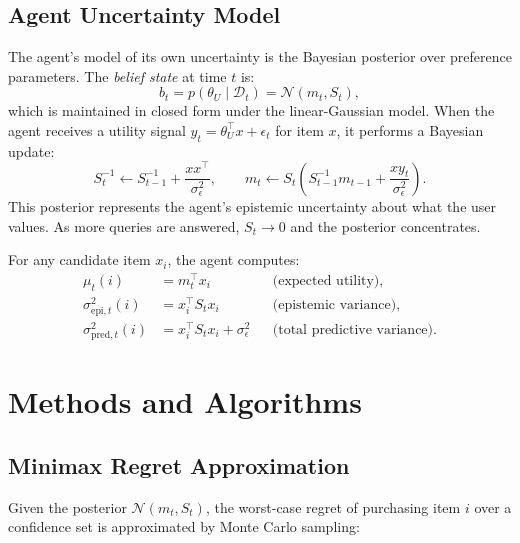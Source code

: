 \documentclass[11pt,letterpaper]{article}
\newcommand{\thetaU}{\theta_U}
\begin{document}
\subsection{Agent Uncertainty Model}
\label{sec:uncertainty_model}

The agent's model of its own uncertainty is the Bayesian posterior over preference parameters.  The \emph{belief state} at time $t$ is:
\begin{equation}
    b_t = p(\thetaU \mid \mathcal{D}_t) = \mathcal{N}(m_t, S_t),
\end{equation}
which is maintained in closed form under the linear-Gaussian model.  When the agent receives a utility signal $y_t = \thetaU^\top x + \epsilon_t$ for item $x$, it performs a Bayesian update:
\begin{equation}
    S_t^{-1} \leftarrow S_{t-1}^{-1} + \frac{x x^\top}{\sigma_\epsilon^2},
    \qquad
    m_t \leftarrow S_t \left( S_{t-1}^{-1} m_{t-1} + \frac{x y_t}{\sigma_\epsilon^2} \right).
    \label{eq:bayesian_update}
\end{equation}
This posterior represents the agent's epistemic uncertainty about what the user values.  As more queries are answered, $S_t \to 0$ and the posterior concentrates.

For any candidate item $x_i$, the agent computes:
\begin{align}
    \mu_t(i) &= m_t^\top x_i && \text{(expected utility)}, \\
    \sigma_{\mathrm{epi},t}^2(i) &= x_i^\top S_t x_i && \text{(epistemic variance)}, \\
    \sigma_{\mathrm{pred},t}^2(i) &= x_i^\top S_t x_i + \sigma_\epsilon^2 && \text{(total predictive variance)}.
\end{align}

\section{Methods and Algorithms}
\label{sec:methods}

\subsection{Minimax Regret Approximation}

Given the posterior $\mathcal{N}(m_t, S_t)$, the worst-case regret of purchasing item $i$ over a confidence set is approximated by Monte Carlo sampling:
\end{document}
